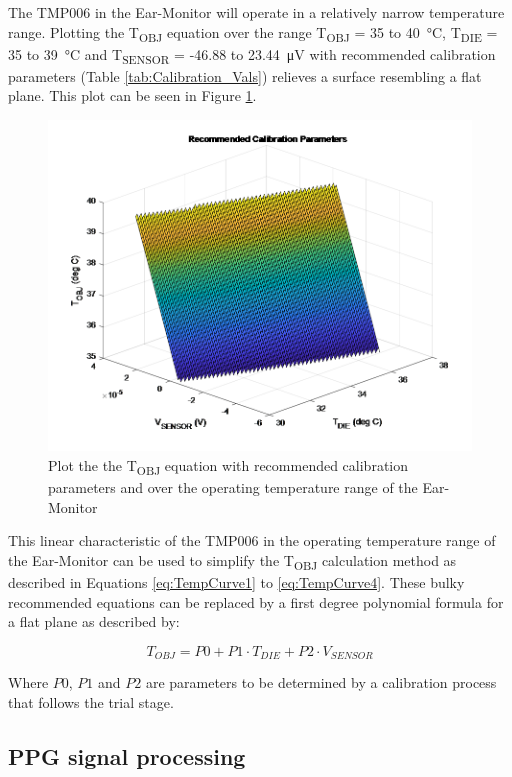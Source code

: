 The TMP006 in the Ear-Monitor will operate in a relatively narrow temperature range. Plotting the T\textsubscript{OBJ} equation over the range T\textsubscript{OBJ} = 35 to \SI{40}{\celsius}, T\textsubscript{DIE} = 35 to \SI{39}{\celsius} and T\textsubscript{SENSOR} = -46.88 to \SI{23.44}{\micro\volt} with recommended calibration parameters (Table \ref{tab:Calibration_Vals}) relieves a surface resembling a flat plane. This plot can be seen in Figure \ref{fig:RecommendedTempCurve}.

\begin{figure}[H]
   \centering
   \includegraphics[scale=0.65]{figs/RecommendedTempCurve.png}
   \caption{Plot the the T\textsubscript{OBJ} equation with recommended calibration parameters and over the operating temperature range of the Ear-Monitor}
   \label{fig:RecommendedTempCurve}
\end{figure}


This linear characteristic of the TMP006 in the operating temperature range of the Ear-Monitor can be used to simplify the T\textsubscript{OBJ} calculation method as described in Equations \ref{eq:TempCurve1} to \ref{eq:TempCurve4}. These bulky recommended equations can be replaced by a first degree polynomial formula for a flat plane as described by:

\begin{equation}
\label{eq:FlatPlane}
T_{OBJ}=P0+P1\cdot T_{DIE}+P2\cdot V_{SENSOR}
\end{equation}

Where $P0$, $P1$ and $P2$ are parameters to be determined by a calibration process that follows the trial stage.

\subsection{PPG signal processing}


